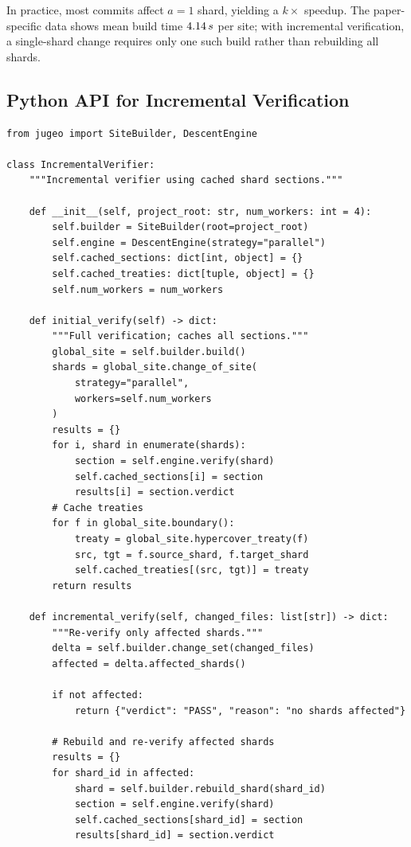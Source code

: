 \documentclass[11pt]{article}
\begin{document}
In practice, most commits affect $a = 1$ shard, yielding a $k\times$
speedup.  The paper-specific data shows mean build time
$4.14\,s$ per site; with incremental verification,
a single-shard change requires only one such build rather than
rebuilding all shards.

\subsection{Python API for Incremental Verification}

\begin{lstlisting}[style=jugeo-python]
from jugeo import SiteBuilder, DescentEngine

class IncrementalVerifier:
    """Incremental verifier using cached shard sections."""
    
    def __init__(self, project_root: str, num_workers: int = 4):
        self.builder = SiteBuilder(root=project_root)
        self.engine = DescentEngine(strategy="parallel")
        self.cached_sections: dict[int, object] = {}
        self.cached_treaties: dict[tuple, object] = {}
        self.num_workers = num_workers
    
    def initial_verify(self) -> dict:
        """Full verification; caches all sections."""
        global_site = self.builder.build()
        shards = global_site.change_of_site(
            strategy="parallel",
            workers=self.num_workers
        )
        results = {}
        for i, shard in enumerate(shards):
            section = self.engine.verify(shard)
            self.cached_sections[i] = section
            results[i] = section.verdict
        # Cache treaties
        for f in global_site.boundary():
            treaty = global_site.hypercover_treaty(f)
            src, tgt = f.source_shard, f.target_shard
            self.cached_treaties[(src, tgt)] = treaty
        return results
    
    def incremental_verify(self, changed_files: list[str]) -> dict:
        """Re-verify only affected shards."""
        delta = self.builder.change_set(changed_files)
        affected = delta.affected_shards()
        
        if not affected:
            return {"verdict": "PASS", "reason": "no shards affected"}
        
        # Rebuild and re-verify affected shards
        results = {}
        for shard_id in affected:
            shard = self.builder.rebuild_shard(shard_id)
            section = self.engine.verify(shard)
            self.cached_sections[shard_id] = section
            results[shard_id] = section.verdict
        

\end{lstlisting}
\end{document}
